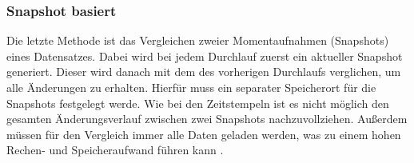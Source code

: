 \subsubsection{Snapshot basiert}
\label{sec:snaps}
Die letzte Methode ist das Vergleichen zweier Momentaufnahmen (Snapshots) eines Datensatzes.
Dabei wird bei jedem Durchlauf zuerst ein aktueller Snapshot generiert.
Dieser wird danach mit dem des vorherigen Durchlaufs verglichen, um alle Änderungen zu erhalten.
Hierfür muss ein separater Speicherort für die Snapshots festgelegt werde.
Wie bei den Zeitstempeln ist es nicht möglich den gesamten Änderungsverlauf zwischen zwei Snapshots nachzuvollziehen.
Außerdem müssen für den Vergleich immer alle Daten geladen werden, was zu einem hohen Rechen- und Speicheraufwand führen kann \cite{cdc_in_nosql}.